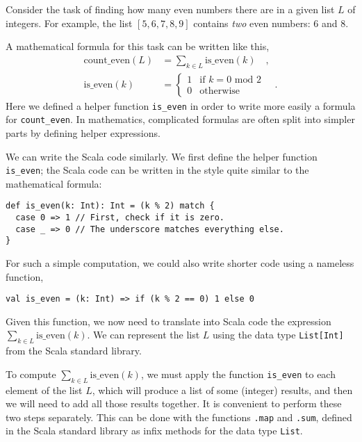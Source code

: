 Consider the task of finding how many even numbers there are in a
given list $L$ of integers. For example, the list $\left[5,6,7,8,9\right]$
contains \emph{two} even numbers: $6$ and $8$.

A mathematical formula for this task can be written like this,
\begin{align*}
\text{count\_even}\left(L\right) & =\sum_{k\in L}\text{is\_even}\left(k\right)\quad,\\
\text{is\_even}\left(k\right) & =\begin{cases}
1 & \text{if }k=0\text{ mod }2\\
0 & \text{otherwise}
\end{cases}\quad.
\end{align*}
Here we defined a helper function \texttt{}\lstinline!is_even!
in order to write more easily a formula for \lstinline!count_even!.
In mathematics, complicated formulas are often split into simpler
parts by defining helper expressions. 

We can write the Scala code similarly. We first define the helper
function \lstinline!is_even!;
the Scala code can be written in the style quite similar to the mathematical
formula:

\begin{lstlisting}
def is_even(k: Int): Int = (k % 2) match {
  case 0 => 1 // First, check if it is zero.
  case _ => 0 // The underscore matches everything else.
}
\end{lstlisting}
For such a simple computation, we could also write shorter code using
a nameless function,

\begin{lstlisting}
val is_even = (k: Int) => if (k % 2 == 0) 1 else 0
\end{lstlisting}
Given this function, we now need to translate into Scala code the
expression $\sum_{k\in L}\text{is\_even}\left(k\right)$. We can represent
the list $L$ using the data type \lstinline!List[Int]!
from the Scala standard library.

To compute $\sum_{k\in L}\text{is\_even}\left(k\right)$, we must
apply the function \texttt{}\lstinline!is_even!
to each element of the list $L$, which will produce a list of some
(integer) results, and then we will need to add all those results
together. It is convenient to perform these two steps separately.
This can be done with the functions \texttt{}\lstinline!.map!
and \lstinline!.sum!, defined
in the Scala standard library as infix methods for the data type \lstinline!List!.

